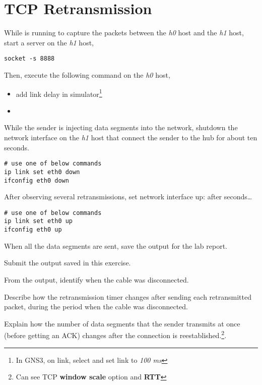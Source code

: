 \documentclass{../UTNetLab}
\begin{document}
\section{TCP Retransmission}
While  is running to capture the packets between the \textit{h0} host and the \textit{h1} host, start a  server on the \textit{h1} host,
\begin{lstlisting}
socket -s 8888
    \end{lstlisting}
Then, execute the following command on the \textit{h0} host,
\begin{itemize}
    \item add link delay in simulator\footnote{In GNS3,  on link, select  and set link  to \textit{100 ms}}
    \item {}
\end{itemize}
While the sender is injecting data segments into the network, shutdown the network interface on the \textit{h1} host that connect the sender to the hub for about ten seconds.
\begin{lstlisting}[emph={eth0}]
# use one of below commands
ip link set eth0 down
ifconfig eth0 down
    \end{lstlisting}

After observing several retransmissions, set network interface up:
after seconds\ldots
\begin{lstlisting}[emph={eth0}]
# use one of below commands
ip link set eth0 up
ifconfig eth0 up
    \end{lstlisting} %
When all the data segments are sent, save the  output for the lab report.

\begin{report}
    \item Submit the  output saved in this exercise.

    \item From the  output, identify when the cable was disconnected.

    \item Describe how the retransmission timer changes after sending each retransmitted packet, during the period when the cable was disconnected.

    \item Explain how the number of data segments that the sender transmits at once (before getting an ACK) changes after the connection is reestablished.\footnote{Can see TCP \textbf{window scale} option and \textbf{RTT}}.
\end{report}
\end{document}
